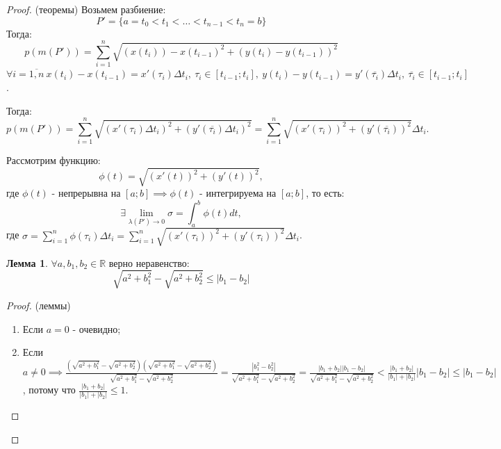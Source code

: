\documentclass{report}
\theoremstyle{definition}
\newtheorem{lemma}{Лемма}[section]
\begin{document}
\begin{proof}
  (теоремы) Возьмем разбиение:
  \begin{equation*}
    P' = \{a=t_0<t_1<\ldots<t_{n-1}<t_n=b\}
  \end{equation*}
  Тогда:
  \begin{equation*}
    p(m(P')) = \sum_{i=1}^{n} \sqrt{(x(t_i)) - x(t_{i-1})^2 + (y(t_i) - y(t_{i-1}))^2}
  \end{equation*}
  $\forall i = \overline{1,n} \ x(t_i) - x(t_{i-1}) = x'(\tau_i)\Delta t_i, \ \tau_i\in[t_{i-1};t_i], \
    y(t_i) - y(t_{i-1}) = y'(\overline{\tau_i})\Delta t_i, \ \overline{\tau_i}\in[t_{i-1};t_i]$.

  Тогда:
  \begin{equation*}
    p(m(P')) = \sum_{i=1}^{n}\sqrt{(x'(\tau_i)\Delta t_i)^2 + (y'(\overline{\tau_i})\Delta t_i)^2} =
    \sum_{i=1}^{n}\sqrt{(x'(\tau_i))^2 + (y'(\overline{\tau_i}))^2}\Delta t_i.
  \end{equation*}

  Рассмотрим функцию:
  \begin{equation*}
    \phi(t) = \sqrt{(x'(t))^2 + (y'(t))^2},
  \end{equation*}
  где $\phi(t)$ - непрерывна на $[a;b] \implies \phi(t)$ - интегрируема на $[a;b]$, то есть:
  \begin{equation*}
    \exists \underset{\lambda(P')\rightarrow0}{\lim}\sigma = \int_{a}^{b}\phi(t)dt,
  \end{equation*}
  где $\sigma = \sum_{i=1}^{n}\phi(\tau_i)\Delta t_i = \sum_{i=1}^{n}\sqrt{(x'(\tau_i))^2 +
      (y'(\tau_i))^2}\Delta t_i$.

  \begin{lemma}
    $\forall a,b_1,b_2\in\mathbb{R}$ верно неравенство:
    \begin{equation*}
      \sqrt{a^2 + b_1^2} - \sqrt{a^2 + b_2^2} \leqslant | b_1 - b_2 |
    \end{equation*}
  \end{lemma}

  \begin{proof}
    (леммы)

    \begin{enumerate}
      \item Если $a=0$ - очевидно;
      \item Если $a\ne0 \implies \frac{(\sqrt{a^2 + b_1^2} - \sqrt{a^2 + b_2^2})
                (\sqrt{a^2 + b_1^2} - \sqrt{a^2 + b_2^2})}{\sqrt{a^2 + b_1^2} - \sqrt{a^2 + b_2^2}} =
              \frac{| b_1^2 - b_2^2 |}{\sqrt{a^2 + b_1^2} - \sqrt{a^2 + b_2^2}} =
              \frac{| b_1 + b_2 | | b_1 - b_2 |}{\sqrt{a^2 + b_1^2} - \sqrt{a^2 + b_2^2}} <
              \frac{| b_1 + b_2 |}{| b_1 | + | b_2 |}| b_1 - b_2 | \leqslant | b_1 - b_2 |$, потому что
            $\frac{| b_1 + b_2 |}{| b_1 | + | b_2 |} \leqslant 1$.
    \end{enumerate}
  \end{proof}


\end{proof}
\end{document}
